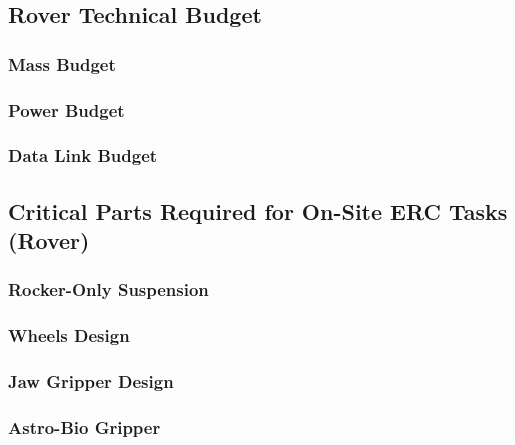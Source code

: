 \subsection{Rover Technical Budget}
\label{subsec:rover_technical_budget}

\subsubsection{Mass Budget}
\label{subsubsec:rover_mass_budget}


\subsubsection{Power Budget}
\label{subsubsec:rover_power_budget}


\subsubsection{Data Link Budget\exampleflag}
\label{subsubsec:rover_data_link_budget}


\subsection{Critical Parts Required for On-Site ERC Tasks (Rover)}
\label{subsec:rover_critical_parts}

\subsubsection{Rocker-Only Suspension}
\label{subsubsec:rocker_suspension}


\subsubsection{Wheels Design}
\label{subsubsec:wheels_design}


\subsubsection{Jaw Gripper Design}
\label{subsubsec:gripper_design}


\subsubsection{Astro-Bio Gripper}
\label{subsubsec:astrobio_gripper}


